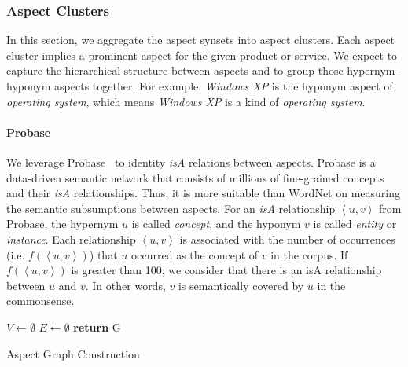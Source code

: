 \subsubsection{Aspect Clusters}
\label{sec:clusters}
In this section, we aggregate the aspect synsets
into aspect clusters.
Each aspect cluster implies a prominent aspect
for the given product or service.
We expect to 
capture the hierarchical structure between aspects
and to group those hypernym-hyponym aspects together.
For example, 
 \textit{Windows XP} is the hyponym aspect of
\textit{operating system}, which means \textit{Windows XP} is
a kind of \textit{operating system}.

\paragraph{Probase}
We leverage Probase~\cite{wu2012probase} to identity \textit{isA} relations
between aspects.
Probase is a data-driven semantic network that
consists of millions of fine-grained concepts
and their \textit{isA} relationships.
Thus, it is more suitable than WordNet on measuring
the semantic subsumptions between aspects.
For an \textit{isA} relationship $\left\langle u,v\right\rangle$ from Probase, 
the hypernym $u$ is called \textit{concept},
and the hyponym $v$ is called \textit{entity} or \textit{instance}.
Each relationship $\left\langle u,v\right\rangle$
is associated with the number of occurrences (i.e. $f(\left\langle u,v\right\rangle)$)
that $u$ occurred as the concept of $v$ in the corpus.
If $f(\left\langle u,v\right\rangle)$ is greater than 100,
we consider that there is an isA relationship between $u$
and $v$. In other words, $v$ is semantically covered 
by $u$ in the commonsense.

\begin{algorithm}[!th]
	\small
	\BlankLine
	$V \leftarrow \emptyset$\;
	$E \leftarrow \emptyset$\;
	{\bf return} G \;
	\caption{Aspect Graph Construction\label{alg:relations}}
\end{algorithm}

